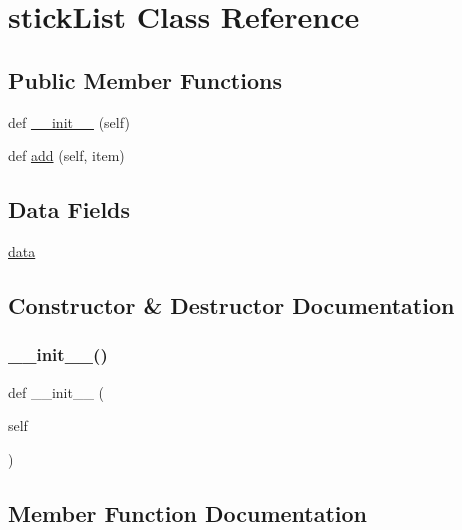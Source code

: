 \hypertarget{classyellow_1_1stick_list}{}\section{stick\+List Class Reference}
\label{classyellow_1_1stick_list}
\subsection*{Public Member Functions}
\begin{DoxyCompactItemize}
\item 
def \hyperlink{classyellow_1_1stick_list_ae64f0875afe3067b97ba370b354b9213}{\+\_\+\+\_\+init\+\_\+\+\_\+} (self)
\item 
def \hyperlink{classyellow_1_1stick_list_a307b88adc33e3b4d944536007e3f841b}{add} (self, item)
\end{DoxyCompactItemize}
\subsection*{Data Fields}
\begin{DoxyCompactItemize}
\item 
\hyperlink{classyellow_1_1stick_list_a511ae0b1c13f95e5f08f1a0dd3da3d93}{data}
\end{DoxyCompactItemize}


\subsection{Constructor \& Destructor Documentation}
\mbox{\label{classyellow_1_1stick_list_ae64f0875afe3067b97ba370b354b9213}} 
\subsubsection{\texorpdfstring{\+\_\+\+\_\+init\+\_\+\+\_\+()}{\_\_init\_\_()}}
{\footnotesize\ttfamily def \+\_\+\+\_\+init\+\_\+\+\_\+ (\begin{DoxyParamCaption}\item[{}]{self }\end{DoxyParamCaption})}



\subsection{Member Function Documentation}
\mbox{\label{classyellow_1_1stick_list_a307b88adc33e3b4d944536007e3f841b}} 
